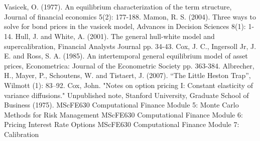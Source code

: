 \documentclass[11pt]{article}
\begin{document}
\newpage
\section*{} \label{bibsection}


\begin{thebibliography}{MMMMM}
 Vasicek, O. (1977). An equilibrium characterization of the term structure, Journal of financial economics 5(2): 177-188.
 Mamon, R. S. (2004). Three ways to solve for bond prices in the vasicek model, Advances in Decision Sciences 8(1): 1-14.
 Hull, J. and White, A. (2001). The general hull-white model and supercalibration, Financial Analysts Journal pp. 34-43.
 Cox, J. C., Ingersoll Jr, J. E. and Ross, S. A. (1985). An intertemporal general equilibrium model of asset prices, Econometrica: Journal of the Econometric Society pp. 363-384.
 Albrecher, H., Mayer, P., Schoutens, W. and Tistaert, J. (2007).
``The Little Heston Trap'', Wilmott (1): 83--92.
  Cox, John. "Notes on option pricing I: Constant elasticity of variance diffusions." Unpublished note, Stanford University, Graduate School of Business (1975).
 MScFE630 Computational Finance Module 5: Monte Carlo Methods for Risk Management
 MScFE630 Computational Finance Module 6: Pricing Interest Rate Options
 MScFE630 Computational Finance Module 7: Calibration

\end{thebibliography}
\end{document}
